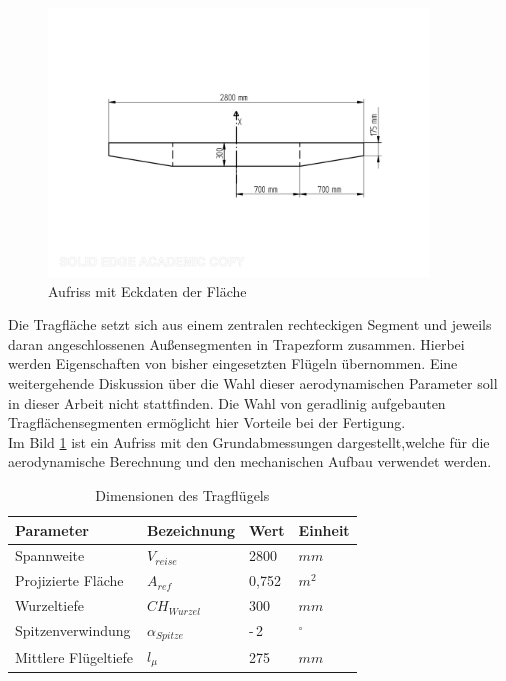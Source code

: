 \begin{figure}[H]
\centering
\includegraphics[width=0.9\textwidth, trim={15mm 40mm 15mm 40mm},clip]{bilder/Fotos/Grundriss_Flaeche.pdf}
\caption{Aufriss mit Eckdaten der Fläche} 
\label{fig:Flächenaufriss}
\end{figure}

Die Tragfläche setzt sich aus einem zentralen rechteckigen Segment und jeweils daran angeschlossenen Außensegmenten 
in Trapezform zusammen.
Hierbei werden Eigenschaften von bisher eingesetzten Flügeln übernommen.
Eine weitergehende Diskussion über die Wahl dieser aerodynamischen Parameter soll in dieser Arbeit nicht stattfinden. 
Die Wahl von geradlinig aufgebauten Tragflächensegmenten ermöglicht hier Vorteile bei der Fertigung.\\
Im Bild \ref{fig:Flächenaufriss} ist ein Aufriss mit den Grundabmessungen dargestellt,welche für die aerodynamische Berechnung und den mechanischen Aufbau verwendet werden.

\begin{table}[h]
\centering
\begin{tabular}{|l|l|l|l|}
\hline
Parameter  & Bezeichnung &  Wert & Einheit \\ \hline
Spannweite  & $V_{reise}$ & 2800 & $mm$\\ \hline
Projizierte Fläche & $A_{ref}$  & 0,752 & $m^2$\\ \hline
Wurzeltiefe & $CH_{Wurzel}$ & 300 & $mm$ \\ \hline
Spitzenverwindung & $\alpha_{Spitze}$ & -\,2 & $^\circ$\\ \hline
Mittlere Flügeltiefe & $l_{\mu}$ & 275 & $mm$ \\ \hline
\end{tabular}
\caption{Dimensionen des Tragflügels}
\label{tab:Dimensionen des Tragflügels}
\end{table}

